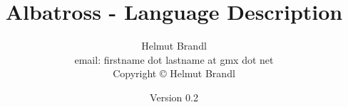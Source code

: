 \documentclass[10pt]{report}
\begin{document}
\title{Albatross - Language Description} \date{Version 0.2}
\author{Helmut Brandl \\
  {\scriptsize email: firstname dot lastname at gmx dot net} \\
  {\scriptsize Copyright {\copyright} Helmut Brandl}} 
\maketitle

\tableofcontents










\end{document}
